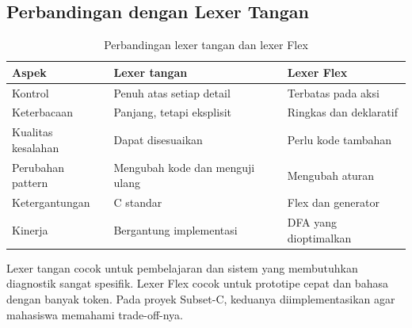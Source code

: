 \subsection{Perbandingan dengan Lexer Tangan}

\begin{table}[H]
\centering
\caption{Perbandingan lexer tangan dan lexer Flex}
\label{tab:ch07-perbandingan}
\begin{tabularx}{\textwidth}{@{}lXX@{}}
\toprule
\textbf{Aspek} & \textbf{Lexer tangan} & \textbf{Lexer Flex} \\
\midrule
Kontrol & Penuh atas setiap detail & Terbatas pada aksi \\
Keterbacaan & Panjang, tetapi eksplisit & Ringkas dan deklaratif \\
Kualitas kesalahan & Dapat disesuaikan & Perlu kode tambahan \\
Perubahan pattern & Mengubah kode dan menguji ulang & Mengubah aturan \\
Ketergantungan & C standar & Flex dan generator \\
Kinerja & Bergantung implementasi & DFA yang dioptimalkan \\
\bottomrule
\end{tabularx}
\end{table}

Lexer tangan cocok untuk pembelajaran dan sistem yang membutuhkan
diagnostik sangat spesifik. Lexer Flex cocok untuk prototipe cepat
dan bahasa dengan banyak token. Pada proyek Subset-C, keduanya
diimplementasikan agar mahasiswa memahami trade-off-nya.
